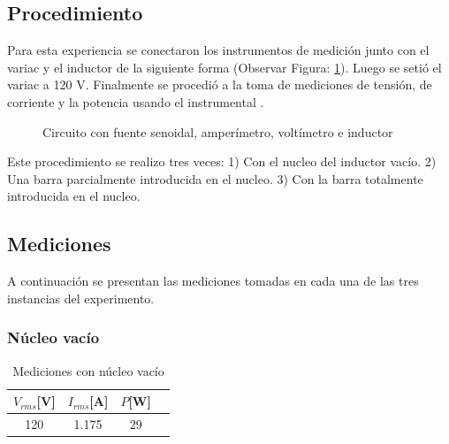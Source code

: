 \documentclass{article}
\begin{document}
        \subsection{Procedimiento}

            Para esta experiencia se conectaron los instrumentos de medición junto con el variac y el inductor de la siguiente forma (Observar Figura: \ref{fig:circuito-inductor}). Luego se setió el variac a 120 V. Finalmente se procedió a la toma de mediciones de tensión, de corriente y la potencia usando el instrumental . 
            \begin{figure}[h!]
                \centering
                \caption{Circuito con fuente senoidal, amperímetro, voltímetro e inductor}
                \label{fig:circuito-inductor}
            \end{figure}

            Este procedimiento se realizo tres veces: 1) Con el nucleo del inductor vacío. 2) Una barra parcialmente introducida en el nucleo. 3) Con la barra totalmente introducida en el nucleo.

        \subsection{Mediciones}
            
            A continuación se presentan las mediciones tomadas en cada una de las tres instancias del experimento.

            \subsubsection{Núcleo vacío}

            \begin{table}[H]
                \centering
                \begin{tabular}{|c|c|c|c|}
                    \hline
                    $V_{rms} $[V] & $I_{rms} $[A] & $P $[W]  \\ \hline
                    120           & 1.175         & 29     \\ \hline
                \end{tabular}
                \caption{Mediciones con núcleo vacío}
                \label{tab:mediciones-nucleo-vacio}
            \end{table}
\end{document}

